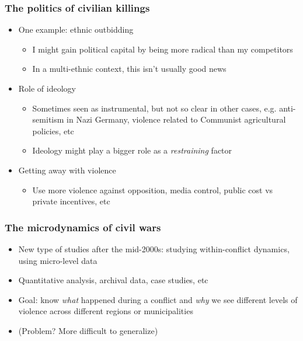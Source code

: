 \documentclass[utf8, xcolor=dvipsnames, handout]{beamer}
\begin{document}
\begin{frame}
\frametitle{The politics of civilian killings}
\centering

\begin{itemize}
  \item<1-> One example: ethnic outbidding
  \begin{itemize}
    \item I might gain political capital by being more radical than my competitors
    \item In a multi-ethnic context, this isn't usually good news
  \end{itemize}
  \item<2-> Role of ideology
  \begin{itemize}
    \item Sometimes seen as instrumental, but not so clear in other cases, e.g. anti-semitism in Nazi Germany, violence related to Communist agricultural policies, etc
    \item Ideology might play a bigger role as a \textit{restraining} factor
  \end{itemize}
  \item<3-> Getting away with violence
  \begin{itemize}
    \item Use more violence against opposition, media control, public cost vs private incentives, etc
  \end{itemize}
  \end{itemize}

\end{frame}


\begin{frame}
\frametitle{The microdynamics of civil wars}
\centering

\begin{itemize}[<+->]
  \item New type of studies after the mid-2000s: studying within-conflict dynamics, using micro-level data
  \item Quantitative analysis, archival data, case studies, etc
  \item Goal: know \textit{what} happened during a conflict and \textit{why} we see different levels of violence across different regions or municipalities
  \item (Problem? More difficult to generalize)
\end{itemize}

\end{frame}
\end{document}
